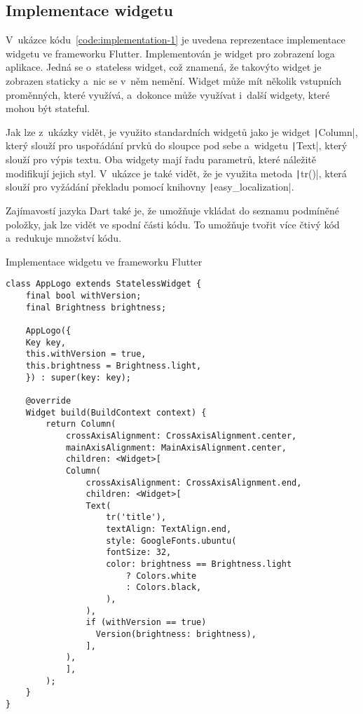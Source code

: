 \subsection{Implementace widgetu}

V~ukázce kódu~\ref{code:implementation-1} je uvedena reprezentace implementace widgetu
ve frameworku Flutter.
Implementován je widget pro zobrazení loga aplikace.
Jedná se o~stateless widget,
což znamená,
že takovýto widget je zobrazen staticky a~nic se v~něm nemění.
Widget může mít několik vstupních proměnných,
které využívá,
a~dokonce může využívat i~další widgety,
které mohou být stateful.

Jak lze z~ukázky vidět,
je využito standardních widgetů jako je widget \texttt|Column|,
který slouží pro uspořádání prvků do sloupce pod sebe
a~widgetu \texttt|Text|,
který slouží pro výpis textu.
Oba widgety mají řadu parametrů,
které náležitě modifikují jejich styl.
V~ukázce je také vidět,
že je využita metoda \texttt|tr()|,
která slouží pro vyžádání překladu pomocí knihovny \texttt|easy_localization|.

Zajímavostí jazyka Dart také je,
že umožňuje vkládat do seznamu podmíněné položky,
jak lze vidět ve spodní části kódu.
To umožňuje tvořit více čtivý kód a~redukuje množství kódu.

\begin{listing}
    \caption{Implementace widgetu ve frameworku Flutter}
    \label{code:implementation-1}
    \begin{verbatim}
class AppLogo extends StatelessWidget {
    final bool withVersion;
    final Brightness brightness;

    AppLogo({
    Key key,
    this.withVersion = true,
    this.brightness = Brightness.light,
    }) : super(key: key);

    @override
    Widget build(BuildContext context) {
        return Column(
            crossAxisAlignment: CrossAxisAlignment.center,
            mainAxisAlignment: MainAxisAlignment.center,
            children: <Widget>[
            Column(
                crossAxisAlignment: CrossAxisAlignment.end,
                children: <Widget>[
                Text(
                    tr('title'),
                    textAlign: TextAlign.end,
                    style: GoogleFonts.ubuntu(
                    fontSize: 32,
                    color: brightness == Brightness.light
                        ? Colors.white
                        : Colors.black,
                    ),
                ),
                if (withVersion == true)
                  Version(brightness: brightness),
                ],
            ),
            ],
        );
    }
}
    \end{verbatim}
\end{listing}

